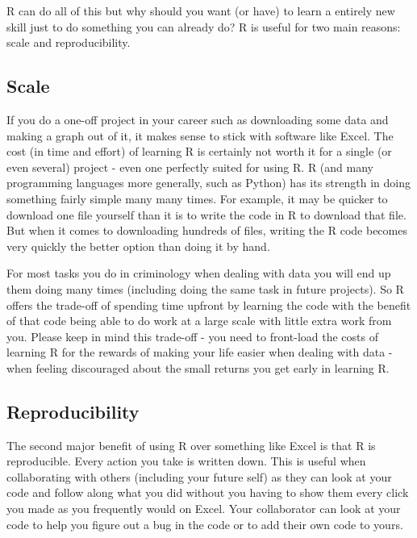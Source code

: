 \documentclass[
  12pt,
]{book}
\begin{document}
R can do all of this but why should you want (or have) to learn a entirely new skill just to do something you can already do? R is useful for two main reasons: scale and reproducibility.

\hypertarget{scale}{%
\subsection*{Scale}\label{scale}}

If you do a one-off project in your career such as downloading some data and making a graph out of it, it makes sense to stick with software like Excel. The cost (in time and effort) of learning R is certainly not worth it for a single (or even several) project - even one perfectly suited for using R. R (and many programming languages more generally, such as Python) has its strength in doing something fairly simple many many times. For example, it may be quicker to download one file yourself than it is to write the code in R to download that file. But when it comes to downloading hundreds of files, writing the R code becomes very quickly the better option than doing it by hand.

For most tasks you do in criminology when dealing with data you will end up them doing many times (including doing the same task in future projects). So R offers the trade-off of spending time upfront by learning the code with the benefit of that code being able to do work at a large scale with little extra work from you. Please keep in mind this trade-off - you need to front-load the costs of learning R for the rewards of making your life easier when dealing with data - when feeling discouraged about the small returns you get early in learning R.

\hypertarget{reproducibility}{%
\subsection*{Reproducibility}\label{reproducibility}}

The second major benefit of using R over something like Excel is that R is reproducible. Every action you take is written down. This is useful when collaborating with others (including your future self) as they can look at your code and follow along what you did without you having to show them every click you made as you frequently would on Excel. Your collaborator can look at your code to help you figure out a bug in the code or to add their own code to yours.
\end{document}
